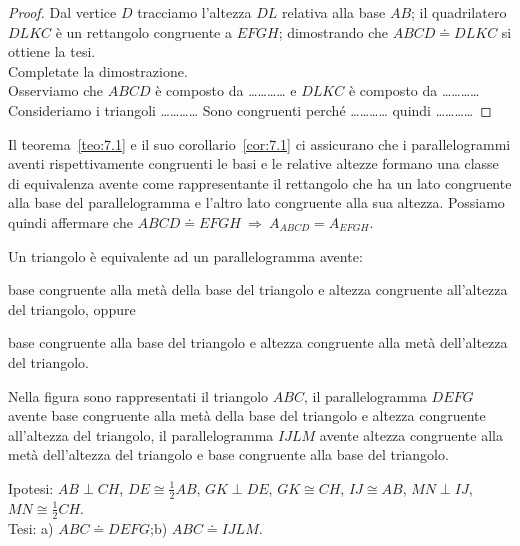\noindent\begin{minipage}{0.65\textwidth}\parindent15pt
\begin{proof}
Dal vertice $D$ tracciamo l'altezza $DL$ relativa alla base $AB$; il 
quadrilatero $DLKC$ è un rettangolo congruente a $EFGH$; dimostrando 
che $ABCD\doteq DLKC$ si ottiene la tesi.\\
Completate la dimostrazione.\\
Osserviamo che $ABCD$ è composto da \ldots\ldots\ldots\ldots{}
e $DLKC$ è composto da \ldots\ldots\ldots\ldots{} 
Consideriamo i triangoli \ldots\ldots\ldots\ldots{}
Sono congruenti perché \ldots\ldots\ldots\ldots{}
quindi \ldots\ldots\ldots\ldots{}
\end{proof}
\end{minipage}\hfil
\begin{minipage}{0.35\textwidth}
  \centering
\end{minipage}\vspace{5pt}

Il teorema~\ref{teo:7.1} e il suo corollario~\ref{cor:7.1} ci 
assicurano che i parallelogrammi aventi rispettivamente congruenti le 
basi e le relative altezze formano una classe di equivalenza avente 
come rappresentante il rettangolo che ha un lato congruente alla base 
del parallelogramma e l'altro lato congruente alla sua altezza. 
Possiamo quindi affermare che $ABCD\doteq EFGH \:\Rightarrow\: 
A_{ABCD} = A_{EFGH}$.

\begin{teorema}\label{teo:7.2}
Un triangolo è equivalente ad un parallelogramma avente:
\begin{enumeratea}
\item base congruente alla metà della base del triangolo e altezza 
congruente all'altezza del triangolo, oppure
\item base congruente alla base del triangolo e altezza congruente 
alla metà dell'altezza del triangolo.
\end{enumeratea}
\end{teorema}

Nella figura sono rappresentati il triangolo $ABC$, il 
parallelogramma $DEFG$ avente base congruente alla metà della base del 
triangolo e altezza congruente all'altezza del triangolo, il 
parallelogramma $IJLM$ avente altezza congruente alla metà 
dell'altezza del triangolo e base congruente alla base del triangolo.

\noindent Ipotesi: $AB\perp CH$, $DE\cong \frac{1}{2}AB$, $GK\perp 
DE$, $GK\cong CH$, $IJ\cong AB$, $MN\perp IJ$, $MN\cong 
\frac{1}{2}CH$.\\
Tesi: a) $ABC\doteq DEFG$;\quad b) $ABC\doteq IJLM$.

